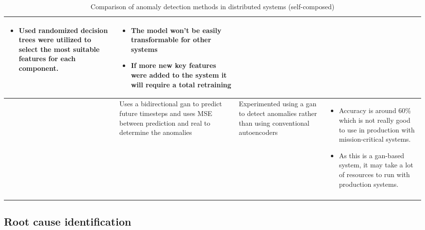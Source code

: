 \begin{longtable}{| p{20mm} | p{43mm} | p{43mm} | p{43mm} |}
\begin{itemize}[leftmargin=*,noitemsep,nolistsep]
    \item Used randomized decision trees were utilized to select the most suitable features for each component.
  \vspace{-7mm}
  \end{itemize} &
  \vspace{-8mm}
  \begin{itemize}[leftmargin=*,noitemsep,nolistsep] 
    \item The model won't be easily transformable for other systems
    \item If more new key features were added to the system it will require a total retraining
  \vspace{-7mm}
  \end{itemize} \\ \hline
  \cite{kumarage2019generative} &
  Uses a bidirectional \ac{gan} to predict future timesteps and uses MSE between prediction and real to determine the anomalies &
  Experimented using a \ac{gan} to detect anomalies rather than using conventional autoencoders &
  \vspace{-8mm}
  \begin{itemize}[leftmargin=*,noitemsep,nolistsep] 
    \item Accuracy is around 60\% which is not really good to use in production with mission-critical systems.
    \item As this is a \ac{gan}-based system, it may take a lot of resources to run with production systems.
  \end{itemize} \\ \hline
  \caption{Comparison of anomaly detection methods in distributed systems (self-composed)}
\end{longtable}

\subsection{Root cause identification}

